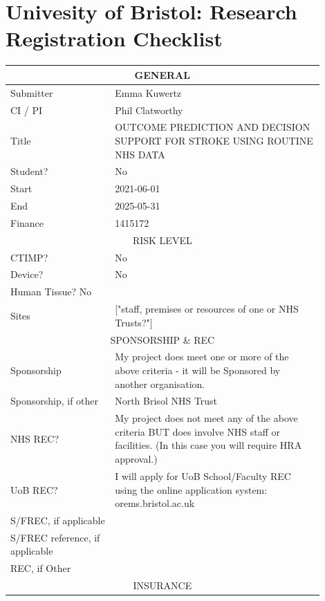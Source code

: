 \documentclass{article}
\begin{document}
\section{Univesity of Bristol: Research Registration Checklist}
\label{app:research_reg_checklist}
\begin{small}
  \begin{center}
    \begin{tabular}{p{0.3\linewidth}p{0.6\linewidth}}
      \hline
      \multicolumn{2}{c}{GENERAL}\\
      \hline
      
      Submitter &  Emma Kuwertz \\
      CI / PI &  Phil Clatworthy \\
      Title &  OUTCOME PREDICTION AND DECISION SUPPORT FOR STROKE USING ROUTINE NHS DATA\\
      Student? &  No\\
      Start &  2021-06-01\\
      End &  2025-05-31\\
      Finance &  1415172\\
      \hline\hline
      \multicolumn{2}{c}{RISK LEVEL}\\
      \hline
      CTIMP? & No\\
      Device? &  No\\
      Human Tissue? No\\
      Sites &  ["staff, premises or resources of one or NHS Trusts?"]\\
      \hline\hline
      \multicolumn{2}{c}{SPONSORSHIP \& REC}\\
      Sponsorship &  My project does meet one or more of the above criteria - it will be Sponsored by another organisation.\\
      Sponsorship, if other &  North Brisol NHS Trust\\
      NHS REC? &  My project does not meet any of the above criteria BUT does involve NHS staff or facilities. (In this case you will require HRA approval.)\\
      UoB REC? &  I will apply for UoB School/Faculty REC using the online application system:  orems.bristol.ac.uk\\
      S/FREC, if applicable & \\
      S/FREC reference, if applicable & \\
      REC, if Other & \\
      \hline\hline
      \multicolumn{2}{c}{INSURANCE}\\

\end{tabular}
\end{center}
\end{small}
\end{document}
